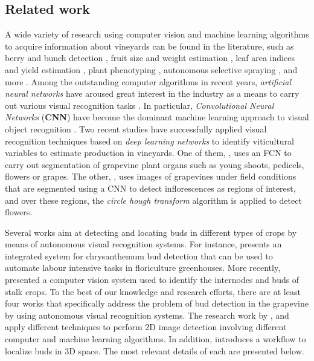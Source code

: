\documentclass[a4paper,authoryear,review]{elsarticle}
\begin{document}
	\subsection{Related work}
	\label{sec:related}
	A wide variety of research using computer vision and machine learning algorithms to acquire information about vineyards \citep{seng2018computer} can be found in the literature, such as berry and bunch detection \citep{nuske2011yield}, fruit size and weight estimation \citep{tardaguila2012automatic}, leaf area indices and yield estimation \citep{diago2012grapevine}, plant phenotyping \citep{herzog2014objective, herzog2014initial}, autonomous selective spraying \citep{berenstein2010grape}, and more \citep{tardaguila2012applications, whalley2013applications}. Among the outstanding computer algorithms in recent years, \emph{artificial neural networks} have aroused great interest in the industry as a means to carry out various visual recognition tasks \citep{hirano2006industry, kahng2017cti, tilgner2019multi}. In particular, \emph{Convolutional Neural Networks} (\textbf{CNN}) have become the dominant machine learning approach to visual object recognition \citep{ning2017inception}. Two recent studies have successfully applied visual recognition techniques based on \emph{deep learning networks} to identify viticultural variables to estimate production in vineyards. One of them, \citet{grimm2019adaptable}, uses an FCN to carry out segmentation of grapevine plant organs such as young shoots, pedicels, flowers or grapes. The other, \citet{rudolph2018efficient}, uses images of grapevines under field conditions that are segmented using a CNN to detect inflorescences as regions of interest, and over these regions, the \emph{circle hough transform} algorithm is applied to detect flowers.
	
	Several works aim at detecting and locating buds in different types of crops by means of autonomous visual recognition systems. For instance, \citet{tarry2014integrated} presents an integrated system for chrysanthemum bud detection that can be used to automate labour intensive tasks in floriculture greenhouses. More recently, \citet{zhao2018research} presented a   computer  vision system used to  identify the  internodes and  buds  of  stalk  crops. To the best of our knowledge and research efforts, there are at least four works that specifically address the problem of bud detection in the grapevine by using autonomous visual recognition systems. The research work by \citet{xu2014detection}, \citet{herzog2014initial} and \citet{perez2017image} apply different techniques to perform 2D image detection involving different computer and machine learning algorithms. In addition, \citet{diaz2018grapevine} introduces a workflow to localize buds in 3D space. The most relevant details of each are presented below.
	
\end{document}
